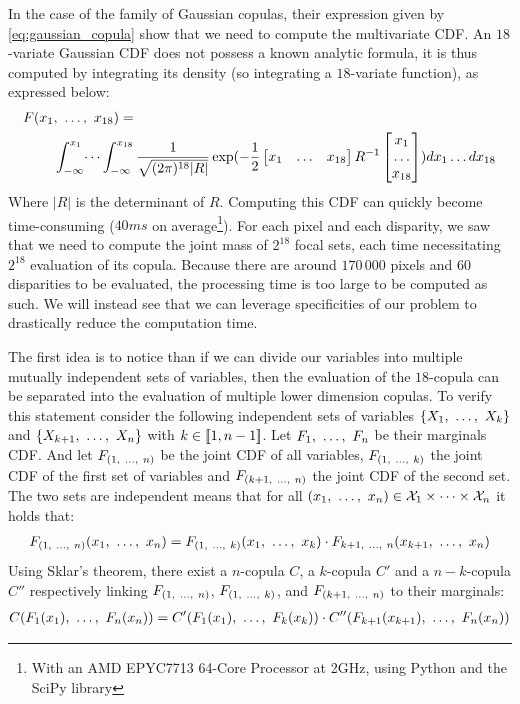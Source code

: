 In the case of the family of Gaussian copulas, their expression given by \cref{eq:gaussian_copula} show that we need to compute the multivariate CDF. An $18$-variate Gaussian CDF does not possess a known analytic formula, it is thus computed by integrating its density (so integrating a $18$-variate function), as expressed below:
\begin{align}\label{eq:gaussian_cdf}
    F(x_1 &, ~\dots, ~ x_{18}) =\nonumber\\ &\int_{-\infty}^{x_1}\dots\int_{-\infty}^{x_{18}}\frac{1}{\sqrt{(2\pi)^{18}|R|}}\exp(-\frac{1}{2}\begin{bmatrix}x_1 & \dots & x_{18}\end{bmatrix}R^{-1}\begin{bmatrix}x_1 \\ \dots \\ x_{18}\end{bmatrix})dx_1\dots dx_{18}
\end{align}
Where $|R|$ is the determinant of $R$. Computing this CDF can quickly become time-consuming ($40ms$ on average\footnote{With an AMD EPYC7713  64-Core Processor at 2GHz, using Python and the SciPy library}). For each pixel and each disparity, we saw that we need to compute the joint mass of $2^{18}$ focal sets, each time necessitating $2^{18}$ evaluation of its copula. Because there are around $170\,000$ pixels and $60$ disparities to be evaluated, the processing time is too large to be computed as such. We will instead see that we can leverage specificities of our problem to drastically reduce the computation time.
 
The first idea is to notice than if we can divide our variables into multiple mutually independent sets of variables, then the evaluation of the $18$-copula can be separated into the evaluation of multiple lower dimension copulas. To verify this statement consider the following independent sets of variables $\{X_1 , ~\dots, ~ X_k\}$ and $\{X_{k+1} , ~\dots, ~ X_n\}$ with $k\in[\![1,n-1]\!]$. Let $F_1 , ~\dots, ~  F_n$ be their marginals CDF. And let $F_{(1 , ~\dots, ~ n)}$ be the joint CDF of all variables, $F_{(1 , ~\dots, ~ k)}$ the joint CDF of the first set of variables and $F_{(k+1 , ~\dots, ~ n)}$ the joint CDF of the second set. The two sets are independent means that for all $(x_1 , ~\dots, ~ x_n)\in\mathcal{X}_1\times\dots\times\mathcal{X}_n$ it holds that:
\begin{align*}
    F_{(1 , ~\dots, ~ n)}(x_1 , ~\dots, ~ x_n) = F_{(1 , ~\dots, ~ k)}(x_1 , ~\dots, ~ x_k)\cdot F_{k+1 , ~\dots, ~ n}(x_{k+1} , ~\dots, ~ x_n)
\end{align*}
Using Sklar's theorem, there exist a $n$-copula $C$, a $k$-copula $C'$ and a $n-k$-copula $C''$ respectively linking $F_{(1 , ~\dots, ~ n)}$, $F_{(1 , ~\dots, ~ k)}$, and $F_{(k+1 , ~\dots, ~ n)}$ to their marginals:
\begin{align}
    C(F_1(x_1) , ~\dots, ~ F_n(x_n)) = C'(F_1(x_1) , ~\dots, ~ F_k(x_k))\cdot C''(F_{k+1}(x_{k+1}) , ~\dots, ~ F_n(x_n))\label{eq:copula_factorizing}
\end{align}

